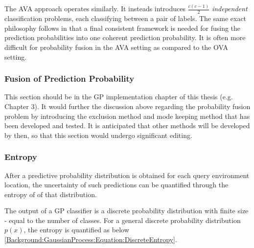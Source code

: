 				The AVA approach operates similarly. It insteads introduces $\frac{c (c - 1)}{2}$ \textit{independent} classification problems, each classifying between a pair of labels. The same exact philosophy follows in that a final consistent framework is needed for fusing the prediction probabilities into one coherent prediction probability. It is often more difficult for probability fusion in the AVA setting as compared to the OVA setting.
				
			\subsubsection{Fusion of Prediction Probability}

				{\color{BurntOrange} This section should be in the GP implementation chapter of this thesis (e.g. Chapter 3). It would further the discussion above regarding the probability fusion problem by introducing the exclusion method and mode keeping method that has been developed and tested. It is anticipated that other methods will be developed by then, so that this section would undergo significant editing.}
				
%							
%				
		
			\subsubsection{Entropy}
			
				After a predictive probability distribution is obtained for each query environment location, the uncertainty of such predictions can be quantified through the entropy of of that distribution.
				
				The output of a GP classifier is a discrete probability distribution with finite size - equal to the number of classes. For a general discrete probability distribution $p(x)$, the entropy is quantified as below \eqref{Background:GaussianProcess:Equation:DiscreteEntropy}.
				
